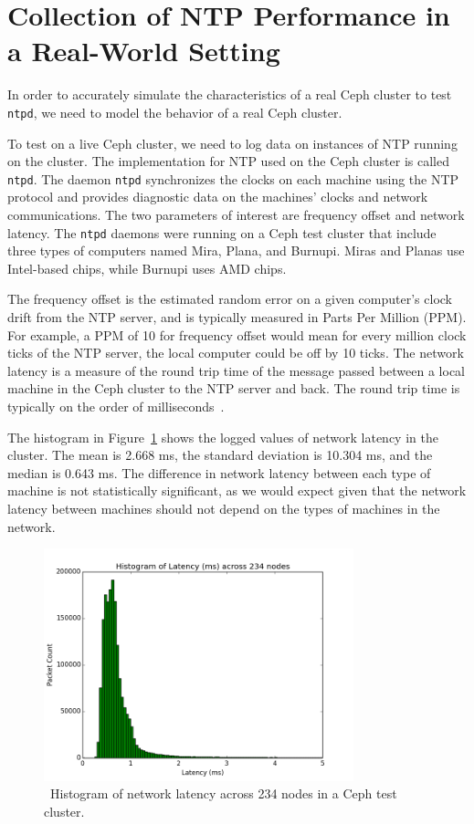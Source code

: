 \section{Collection of NTP Performance in a Real-World Setting}

In order to accurately simulate the
characteristics of a real Ceph cluster to test \texttt{ntpd}, we need to model the
behavior of a real Ceph cluster.

To test on a live Ceph cluster, we need to log data on 
instances of NTP running on the cluster. The implementation for NTP 
used on the Ceph cluster is called \texttt{ntpd}. The daemon \texttt{ntpd} 
synchronizes the clocks on each machine using the NTP protocol and
provides diagnostic data on the machines' clocks and network 
communications. The two parameters of interest are frequency offset and
network latency. The \texttt{ntpd} daemons were running on a Ceph
test cluster that include three types of computers named Mira,
Plana, and Burnupi. Miras and Planas use Intel-based chips, while
Burnupi uses AMD chips.

The frequency offset is the estimated random error on a given computer's
clock drift from the NTP server, and is typically measured in Parts
Per Million (PPM). For example, a PPM of 10 for frequency offset would
mean for every million clock ticks of the NTP server, the local
computer could be off by 10 ticks. The network latency is a measure of
the round trip time of the message passed between a local machine in
the Ceph cluster to the NTP server and back. The round trip time
is typically on the order of milliseconds~\citep{Sage}.

The histogram in Figure~\ref{fig:latency-hist} shows the logged
values of network latency in the cluster. The mean is 2.668 ms, the 
standard deviation is 10.304 ms, and the median is 0.643 ms. The 
difference in network latency between each type of machine is not
statistically significant, as we would expect given that the network
latency between machines should not depend on the types of 
machines in the network. 

\begin{figure}[h]
  \centering
  \caption{~Histogram of network latency across 234 nodes in a Ceph test cluster.} 
  \label{fig:latency-hist}
  \includegraphics[width=0.8\textwidth]{latency-hist.png}
\end{figure}


